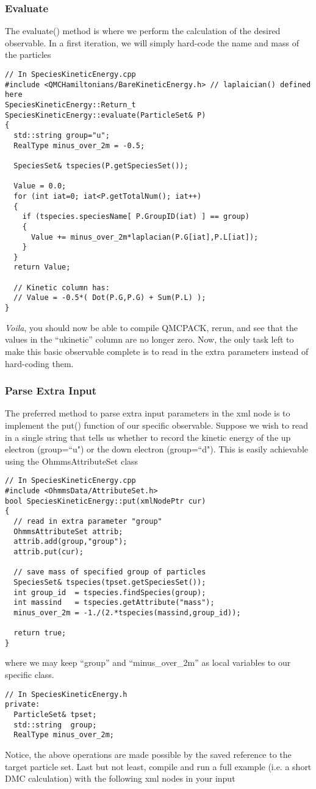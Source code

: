 \subsubsection{Evaluate}
The evaluate() method is where we perform the calculation of the desired observable. In a first iteration, we will simply hard-code the name and mass of the particles
\begin{lstlisting}[style=C++]
// In SpeciesKineticEnergy.cpp
#include <QMCHamiltonians/BareKineticEnergy.h> // laplaician() defined here
SpeciesKineticEnergy::Return_t SpeciesKineticEnergy::evaluate(ParticleSet& P)
{
  std::string group="u";
  RealType minus_over_2m = -0.5;
  
  SpeciesSet& tspecies(P.getSpeciesSet());
  
  Value = 0.0;
  for (int iat=0; iat<P.getTotalNum(); iat++)
  {
    if (tspecies.speciesName[ P.GroupID(iat) ] == group)
    {
      Value += minus_over_2m*laplacian(P.G[iat],P.L[iat]);
    }
  }
  return Value;
  
  // Kinetic column has:
  // Value = -0.5*( Dot(P.G,P.G) + Sum(P.L) );
}
\end{lstlisting}
\textit{Voila}, you should now be able to compile QMCPACK, rerun, and see that the values in the ``ukinetic'' column are no longer zero. Now, the only task left to make this basic observable complete is to read in the extra parameters instead of hard-coding them.

\subsubsection{Parse Extra Input}
The preferred method to parse extra input parameters in the xml node is to implement the put() function of our specific observable. Suppose we wish to read in a single string that tells us whether to record the kinetic energy of the up electron (group=``u") or the down electron (group=``d"). This is easily achievable using the OhmmsAttributeSet class
\begin{lstlisting}[style=C++]
// In SpeciesKineticEnergy.cpp
#include <OhmmsData/AttributeSet.h>
bool SpeciesKineticEnergy::put(xmlNodePtr cur)
{ 
  // read in extra parameter "group"
  OhmmsAttributeSet attrib;
  attrib.add(group,"group");
  attrib.put(cur);
  
  // save mass of specified group of particles
  SpeciesSet& tspecies(tpset.getSpeciesSet());
  int group_id  = tspecies.findSpecies(group);
  int massind   = tspecies.getAttribute("mass");
  minus_over_2m = -1./(2.*tspecies(massind,group_id));
  
  return true;
}
\end{lstlisting}
where we may keep ``group'' and ``minus\_over\_2m'' as local variables to our specific class.
\begin{lstlisting}[style=C++]
// In SpeciesKineticEnergy.h
private:
  ParticleSet& tpset;
  std::string  group;
  RealType minus_over_2m;
\end{lstlisting}
Notice, the above operations are made possible by the saved reference to the target particle set. Last but not least, compile and run a full example (i.e. a short DMC calculation) with the following xml nodes in your input

